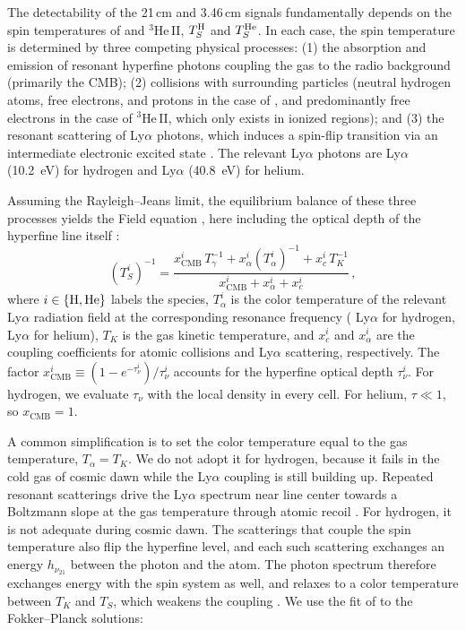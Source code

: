 \documentclass[apj,twocolumn, appendixfloats, twocolappendix, numberedappendix, tighten]{openjournal}
\begin{document}
\begin{appendix}
The detectability of the 21\,cm and 3.46\,cm signals fundamentally depends on the spin temperatures of  and $^3$He\,II, $T_S^{\rm H}$ and $T_S^{\rm He}$. In each case, the spin temperature is determined by three competing physical processes: (1) the absorption and emission of resonant hyperfine photons coupling the gas to the radio background (primarily the CMB); (2) collisions with surrounding particles (neutral hydrogen atoms, free electrons, and protons in the case of , and predominantly free electrons in the case of $^3$He\,II, which only exists in ionized regions); and (3) the resonant scattering of Ly$\alpha$ photons, which induces a spin-flip transition via an intermediate electronic excited state \citep[Wouthuysen--Field effect;][]{Wouthuysen1952, Field1958}. The relevant Ly$\alpha$ photons are  Ly$\alpha$ (10.2~eV) for hydrogen and  Ly$\alpha$ (40.8~eV) for helium.

Assuming the Rayleigh--Jeans limit, the equilibrium balance of these three processes yields the Field equation \citep{Furlanetto2006, McQuinn2009}, here including the optical depth of the hyperfine line itself \citep{Venumadhav2018}:
\begin{equation}
    \left(T_S^i\right)^{-1} = \frac{x_\mathrm{CMB}^i\,T_\gamma^{-1} + x_\alpha^i
    \left(T_\alpha^i\right)^{-1} + x_c^i \, T_K^{-1}}
    {x_\mathrm{CMB}^i + x_\alpha^i + x_c^i}\,,
    \label{eq:Ts}
\end{equation}
where $i \in \{{\rm H}, {\rm He}\}$ labels the species, $T_\alpha^i$ is the color temperature of the relevant Ly$\alpha$ radiation field at the corresponding resonance frequency ( Ly$\alpha$ for hydrogen,  Ly$\alpha$ for helium), $T_K$ is the gas kinetic temperature, and $x_c^i$ and $x_\alpha^i$ are the coupling coefficients for atomic collisions and Ly$\alpha$ scattering, respectively. The factor $x_\mathrm{CMB}^i \equiv (1 - e^{-\tau^i_\nu})/\tau^i_\nu$ accounts for the hyperfine optical depth $\tau^i_\nu$. For hydrogen, we evaluate $\tau_\nu$ with the local  density in every cell. For helium, $\tau \ll 1$, so $x_\mathrm{CMB}=1$.


A common simplification is to set the color temperature equal to the gas temperature, $T_\alpha = T_K$. We do not adopt it for hydrogen, because it fails in the cold gas of cosmic dawn while the Ly$\alpha$ coupling is still building up. Repeated resonant scatterings drive the Ly$\alpha$ spectrum near line center towards a Boltzmann slope at the gas temperature through atomic recoil \citep{Wouthuysen1952, Field1958}. For hydrogen, it is not adequate during cosmic dawn. The scatterings that couple the spin temperature also flip the hyperfine level, and each such scattering exchanges an energy $h_{\nu_{21}}$ between the photon and the atom. The photon spectrum therefore exchanges energy with the spin system as well, and relaxes to a color temperature between $T_K$ and $T_S$, which weakens the coupling \citep{Chuzhoy2006, Hirata2006}. We use the fit of \citet{Hirata2006} to the Fokker--Planck solutions:


\end{appendix}
\end{document}

